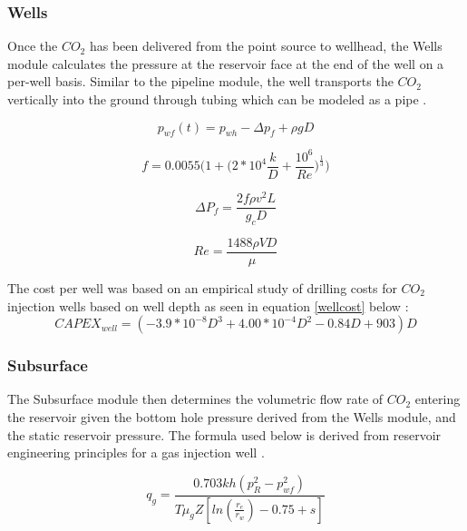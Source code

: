 \documentclass[balance,upint,subscriptcorrection,varvw,mathalfa=cal=boondoxo,spanish,french,vietnamese,russian,greek,pdf-a,colorlinks]{asmeconf}
\begin{document}
\subsubsection{Wells}

Once the $CO_{2}$ has been delivered from the point source to wellhead, the Wells module calculates the pressure at the reservoir face at the end of the well on a per-well basis. Similar to the pipeline module, the well transports the $CO_{2}$ vertically into the ground through tubing which can be modeled as a pipe \cite{sheng_chapter_2011} \cite{Moody} \cite{IHS}. 

\begin{equation}
    p_{wf}(t) = p_{wh}-\Delta p_f + \rho gD
\end{equation}

\begin{equation}
    f = 0.0055\bigg(1+\bigg(2*10^4\frac{k}{D}+\frac{10^6}{Re}\bigg)^{\frac{1}{3}}\bigg)
\end{equation}

\begin{equation}
    \Delta P_f = \frac{2f\rho v^2L}{g_cD}
\end{equation}

\begin{equation}
    Re = \frac{1488\rho VD}{\mu}
\end{equation}

The cost per well was based on an empirical study of drilling costs for $CO_{2}$ injection wells based on well depth as seen in equation \ref{wellcost} below \cite{ogden}:
\begin{equation} \label{wellcost}
    CAPEX_{well} = (-3.9*10^{-8}D^3 + 4.00*10^{-4}D^2 - 0.84D + 903)D
\end{equation}

\subsubsection{Subsurface}

The Subsurface module then determines the volumetric flow rate of $CO_{2}$ entering the reservoir given the bottom hole pressure derived from the Wells module, and the static reservoir pressure. The formula used below is derived from reservoir engineering principles for a gas injection well \cite{AAPG}.

\begin{equation}
    q_g = \frac{0.703kh(p_{R}^{2}-p_{wf}^{2})}{T\mu_{g}Z[ln(\frac{r_e}{r_w})-0.75+s]}
\end{equation}
\end{document}
